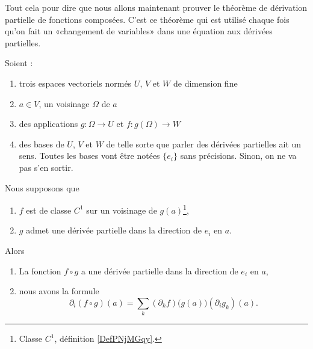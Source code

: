 \begin{normaltext}
    Tout cela pour dire que nous allons maintenant prouver le théorème de dérivation partielle de fonctions composées. C'est ce théorème qui est utilisé chaque fois qu'on fait un «changement de variables» dans une équation aux dérivées partielles.
\end{normaltext}


\begin{theorem}     \label{THOooKBTYooWFtoSF}
    Soient :
    \begin{enumerate}
        \item
            trois espaces vectoriels normés \( U\), \( V\) et \( W\) de dimension fine
        \item
            \( a\in V\), un voisinage \( \Omega\) de \( a\)
        \item
            des applications \( g\colon \Omega\to U\) et \( f\colon g(\Omega)\to W\)
        \item
            des bases de \( U\), \( V\) et \( W\) de telle sorte que parler des dérivées partielles ait un sens. Toutes les bases vont être notées \( \{ e_i \}\) sans précisions. Sinon, on ne va pas s'en sortir.
    \end{enumerate}
    Nous supposons que
    \begin{enumerate}
        \item
            \( f\) est de classe \( C^1\) sur un voisinage de \( g(a)\)\footnote{Classe \( C^1\), définition \ref{DefPNjMGqy}.},
        \item
            \( g\) admet une dérivée partielle dans la direction de \( e_i\) en \( a\).
    \end{enumerate}
    Alors 
    \begin{enumerate}
        \item
            La fonction \( f\circ g\) a une dérivée partielle dans la direction de \( e_i\) en \( a\),
        \item
    nous avons la formule
    \begin{equation}        \label{EQooZMAUooIusxgD}
        \partial_i(f\circ g)(a)=\sum_{k}(\partial_kf)\big( g(a) \big)(\partial_ig_k)(a).
    \end{equation}
    \end{enumerate}
\end{theorem}

